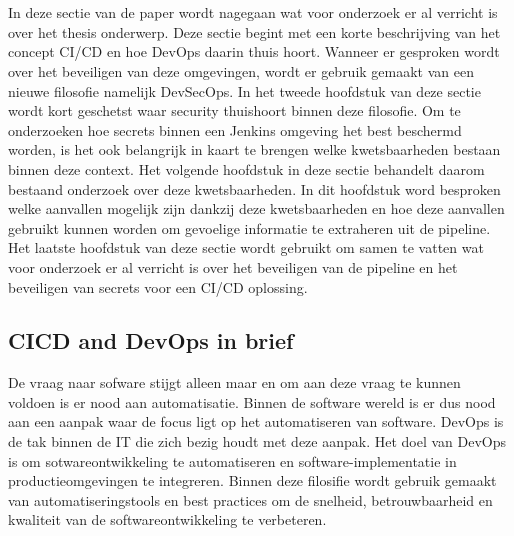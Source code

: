 \chapter{}%
\label{ch:stand-van-zaken}



In deze sectie van de paper wordt nagegaan wat voor onderzoek er al verricht is over het thesis onderwerp. Deze sectie begint met een korte beschrijving van het concept CI/CD en hoe DevOps daarin thuis hoort. Wanneer er gesproken wordt over het beveiligen van deze omgevingen, wordt er gebruik gemaakt van een nieuwe filosofie namelijk DevSecOps. In het tweede hoofdstuk van deze sectie wordt kort geschetst waar security thuishoort binnen deze filosofie. Om te onderzoeken hoe secrets binnen een Jenkins omgeving het best beschermd worden, is het ook belangrijk in kaart te brengen welke kwetsbaarheden bestaan binnen deze context. Het volgende hoofdstuk in deze sectie behandelt daarom bestaand onderzoek over deze kwetsbaarheden. In dit hoofdstuk word besproken welke aanvallen mogelijk zijn dankzij deze kwetsbaarheden en hoe deze aanvallen gebruikt kunnen worden om gevoelige informatie te extraheren uit de pipeline. Het laatste hoofdstuk van deze sectie wordt gebruikt om samen te vatten wat voor onderzoek er al verricht is over het beveiligen van de pipeline en het beveiligen van secrets voor een CI/CD oplossing.

\section{
{CICD and DevOps in brief}}
\label{sec:CICD em DevOps in kort}

De vraag naar sofware stijgt alleen maar en om aan deze vraag te kunnen voldoen is er nood aan automatisatie. Binnen de software wereld is er dus nood aan een aanpak waar de focus ligt op het automatiseren van software. DevOps is de tak binnen de IT die zich bezig houdt met deze aanpak. Het doel van DevOps is om sotwareontwikkeling te automatiseren en software-implementatie in productieomgevingen te integreren. Binnen deze filosifie wordt gebruik gemaakt van automatiseringstools en best practices om de snelheid, betrouwbaarheid en kwaliteit van de softwareontwikkeling te verbeteren.
\newline

